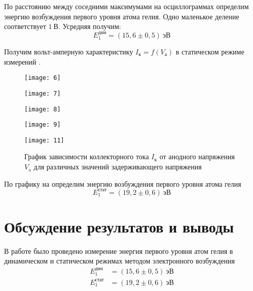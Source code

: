 \documentclass[a4paper, 12pt]{article}
\begin{document}
По расстоянию между соседними максимумами на осциллограммах определим
энергию возбуждения первого уровня атома гелия. Одно маленькое деление
соответствует $1\ \text{В}$. Усредняя получим:
\[
    E_1^\text{дин} = (15,6 \pm 0,5)\ \text{эВ}
\]

Получим вольт-амперную характеристику $I_\text{к} = f (V_\text{а})$ в
статическом режиме измерений .


\begin{figure}[H]
    \begin{floatrow}

        {
        \texttt{[image: 6]}
    }

        {
        \texttt{[image: 7]}
    }
    \end{floatrow}
\end{figure}


\begin{figure}[H]
    \begin{floatrow}

        {
        \texttt{[image: 8]}
    }

        {
        \texttt{[image: 9]}
    }
    \end{floatrow}
\end{figure}



\begin{figure}[H]
    \texttt{[image: 11]} 
    \caption{График зависимости коллекторного тока $I_\text{к}$ от анодного
    напряжения $V_\text{a}$ для различных значений задерживающего
напряжения}
\label{fig:11}
\end{figure}

По графику на  определим энергию возбуждения первого
уровня атома гелия
\[
    E_1^\text{стат} = (19,2 \pm 0,6)\ \text{эВ}
\]







\section{Обсуждение результатов и выводы}
В работе было проведено измерение энергия первого уровня атом гелия в
динамическом и статическом режимах методом электронного возбуждения
\begin{equation*}
    \begin{aligned}
        E_1^\text{дин} &= (15,6 \pm 0,5)\ \text{эВ}\\
        E_1^\text{стат} &= (19,2 \pm 0,6)\ \text{эВ}
    \end{aligned}
\end{equation*}
\end{document}
